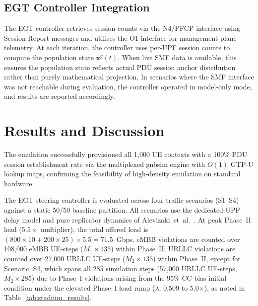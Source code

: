 \documentclass[conference]{IEEEtran}
\begin{document}
\subsection{EGT Controller Integration}
\label{sec:controller_integration}

The EGT controller retrieves session counts via the
N4/PFCP interface using Session Report messages and
utilises the O1 interface for management-plane telemetry.
At each iteration, the controller uses per-UPF session
counts to compute the population state $\mathbf{x}^g(t)$.
When live SMF data is available, this ensures the
population state reflects actual PDU session anchor
distribution rather than purely mathematical projection.
In scenarios where the SMF interface was not reachable
during evaluation, the controller operated in model-only
mode, and results are reported accordingly.

\section{Results and Discussion}
\label{sec:results}

The emulation successfully provisioned all 1,000 UE contexts
with a 100\% PDU session establishment rate via the multiplexed
gnbsim engine with $O(1)$ GTP-U lookup maps, confirming
the feasibility of high-density emulation on standard hardware.

The EGT steering controller is evaluated across four traffic
scenarios (S1--S4) against a static 50/50 baseline partition.
All scenarios use the dedicated-UPF delay model and pure
replicator dynamics of Alevizaki~et~al.~\cite{Alevizaki2021upf}.
At peak Phase~II load ($5.5\times$ multiplier), the total offered
load is $(800 \times 10 + 200 \times 25) \times 5.5 = 71.5$~Gbps.
eMBB violations are counted over 108,000 eMBB UE-steps
($M_1 \times 135$) within Phase~II; URLLC violations are counted
over 27,000 URLLC UE-steps ($M_2 \times 135$) within Phase~II,
except for Scenario~S4, which spans all 285 simulation steps
(57,000 URLLC UE-steps, $M_2 \times 285$) due to Phase~I
violations arising from the 95\% CC-bias initial condition under
the elevated Phase~I load ramp ($\lambda$: 0.509 to 5.0$\times$),
as noted in Table~\ref{tab:stadium_results}.
\end{document}
